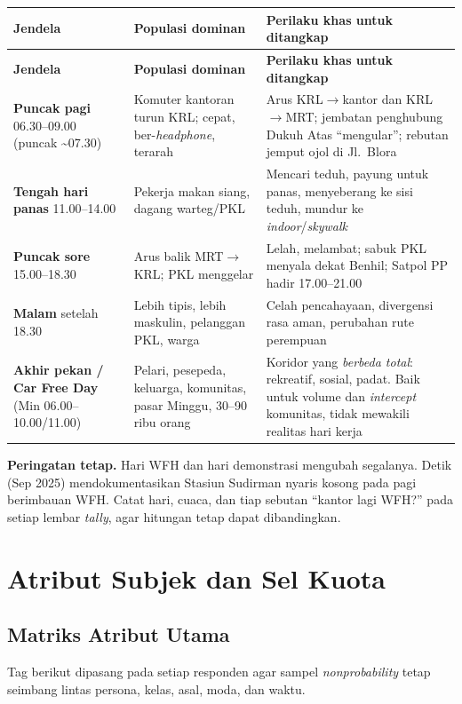 \documentclass[11pt,a4paper]{report}
\begin{document}
\begin{longtable}{@{}p{3.4cm}p{4.2cm}p{6.4cm}@{}}
\toprule
\textbf{Jendela} & \textbf{Populasi dominan} & \textbf{Perilaku khas untuk ditangkap} \\
\midrule
\endfirsthead
\toprule
\textbf{Jendela} & \textbf{Populasi dominan} & \textbf{Perilaku khas untuk ditangkap} \\
\midrule
\endhead
\textbf{Puncak pagi} 06.30--09.00 (puncak \textasciitilde07.30) &
Komuter kantoran turun KRL; cepat, ber-\emph{headphone}, terarah &
Arus KRL$\rightarrow$kantor dan KRL$\rightarrow$MRT; jembatan penghubung Dukuh Atas
``mengular''; rebutan jemput ojol di Jl.\ Blora \\
\addlinespace
\textbf{Tengah hari panas} 11.00--14.00 &
Pekerja makan siang, dagang warteg/PKL &
Mencari teduh, payung untuk panas, menyeberang ke sisi teduh, mundur ke
\emph{indoor}/\emph{skywalk} \\
\addlinespace
\textbf{Puncak sore} 15.00--18.30 &
Arus balik MRT$\rightarrow$KRL; PKL menggelar &
Lelah, melambat; sabuk PKL menyala dekat Benhil; Satpol PP hadir 17.00--21.00 \\
\addlinespace
\textbf{Malam} setelah 18.30 &
Lebih tipis, lebih maskulin, pelanggan PKL, warga &
Celah pencahayaan, divergensi rasa aman, perubahan rute perempuan \\
\addlinespace
\textbf{Akhir pekan / Car Free Day} (Min 06.00--10.00/11.00) &
Pelari, pesepeda, keluarga, komunitas, pasar Minggu, 30--90 ribu orang &
Koridor yang \emph{berbeda total}: rekreatif, sosial, padat. Baik untuk volume dan
\emph{intercept} komunitas, tidak mewakili realitas hari kerja \\
\bottomrule
\end{longtable}

\noindent\textbf{Peringatan tetap.} Hari WFH dan hari demonstrasi mengubah segalanya.
Detik (Sep 2025) mendokumentasikan Stasiun Sudirman nyaris kosong pada pagi berimbauan
WFH. Catat hari, cuaca, dan tiap sebutan ``kantor lagi WFH?'' pada setiap lembar
\emph{tally}, agar hitungan tetap dapat dibandingkan.

\chapter{Atribut Subjek dan Sel Kuota}

\section{Matriks Atribut Utama}
Tag berikut dipasang pada setiap responden agar sampel \emph{nonprobability} tetap
seimbang lintas persona, kelas, asal, moda, dan waktu.
\end{document}
